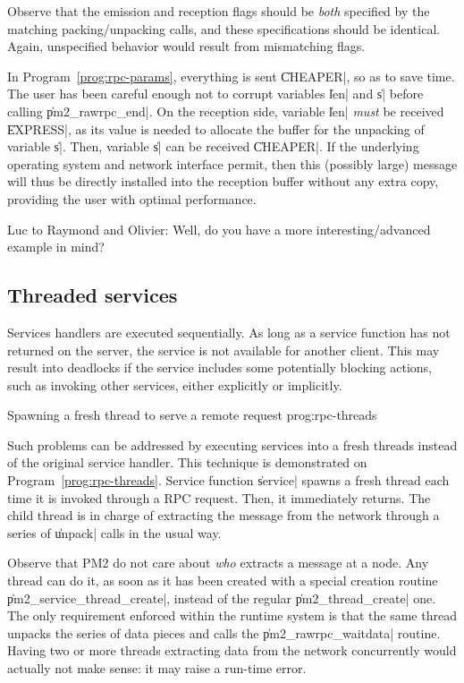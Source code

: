 Observe that the emission and reception flags should be \emph{both}
specified  by the matching packing/unpacking calls, and these
specifications should be identical. Again, unspecified behavior would
result from mismatching flags.

In Program~\ref{prog:rpc-params}, everything is sent \|CHEAPER|, so as
to save time. The user has been careful enough not to corrupt
variables \|len| and \|s| before calling \|pm2_rawrpc_end|. On the
reception side, variable \|len| \emph{must} be received \|EXPRESS|, as
its value is needed to allocate the buffer for the unpacking of
variable \|s|.  Then, variable \|s| can be received \|CHEAPER|. If the
underlying operating system and network interface permit, then this
(possibly large) message will thus be directly installed into the
reception buffer without any extra copy, providing the user with
optimal performance.



\begin{note}
  Luc to Raymond and Olivier: Well, do you have a more
  interesting/advanced example in mind?
\end{note}

\subsection{Threaded services}

Services handlers are executed sequentially. As long as a service
function has not returned on the server, the service is not available
for another client. This may result into deadlocks if the service
includes some potentially blocking actions, such as invoking other
services, either explicitly or implicitly.

 {Spawning a fresh thread to serve a
  remote request} {prog:rpc-threads}

Such problems can be addressed by executing services into a fresh
threads instead of the original service handler. This technique is
demonstrated on Program~\ref{prog:rpc-threads}. Service function
\|service| spawns a fresh thread each time it is invoked
through a RPC request. Then, it immediately returns. The child thread
is in charge of extracting the message from the network through a series
of \|unpack| calls in the usual way. 

Observe that PM2 do not care about \emph{who} extracts a message at a
node. Any thread can do it, as soon as it has been created with a
special creation routine \|pm2_service_thread_create|, instead of the
regular \|pm2_thread_create| one. The only requirement enforced within
the runtime system is that the same thread unpacks the series of data
pieces and calls the \|pm2_rawrpc_waitdata| routine. Having two or
more threads extracting data from the network concurrently would
actually not make sense: it may raise a run-time error.


